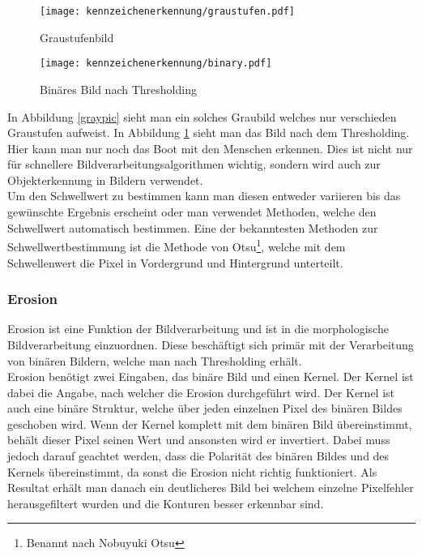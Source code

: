 \begin{figure}[htbp]
    \centering
    \begin{minipage}[t]{0.45\linewidth}
        \centering
        \texttt{[image: kennzeichenerkennung/graustufen.pdf]}
        \caption{Graustufenbild}
        \label{graypic}
    \end{minipage}
    \hfill
    \begin{minipage}[t]{0.45\linewidth}
        \centering
        \texttt{[image: kennzeichenerkennung/binary.pdf]}
        \caption{Binäres Bild nach Thresholding}
        \label{binarypic}
    \end{minipage}
\end{figure}

In Abbildung \ref{graypic} sieht man ein solches Graubild welches nur verschieden Graustufen aufweist. In Abbildung \ref{binarypic} sieht man das 
Bild nach dem Thresholding. Hier kann man nur noch das Boot mit den Menschen erkennen. Dies ist nicht nur für schnellere 
Bildverarbeitungsalgorithmen wichtig, sondern wird auch zur Objekterkennung in Bildern verwendet.\\

Um den Schwellwert zu bestimmen kann man diesen entweder variieren bis das gewünschte Ergebnis erscheint oder man 
verwendet Methoden, welche den Schwellwert automatisch bestimmen. Eine der bekanntesten Methoden zur Schwellwertbestimmung 
ist die Methode von Otsu\footnote{Benannt nach Nobuyuki Otsu}, welche mit dem Schwellenwert die Pixel in Vordergrund und Hintergrund unterteilt.

\subsubsection{Erosion}
Erosion ist eine Funktion der Bildverarbeitung und ist in die morphologische Bildverarbeitung einzuordnen. Diese beschäftigt 
sich primär mit der Verarbeitung von binären Bildern, welche man nach Thresholding erhält.\\

Erosion benötigt zwei Eingaben, das binäre Bild und einen Kernel. Der Kernel ist dabei die Angabe, nach welcher die Erosion 
durchgeführt wird. Der Kernel ist auch eine binäre Struktur, welche über jeden einzelnen Pixel des binären Bildes geschoben 
wird. Wenn der Kernel komplett mit dem binären Bild übereinstimmt, behält dieser Pixel seinen Wert und ansonsten wird er 
invertiert. Dabei muss jedoch darauf geachtet werden, dass die Polarität des binären Bildes und des Kernels übereinstimmt, 
da sonst die Erosion nicht richtig funktioniert. Als Resultat erhält man danach ein deutlicheres Bild bei welchem einzelne 
Pixelfehler herausgefiltert wurden und die Konturen besser erkennbar sind.\\

